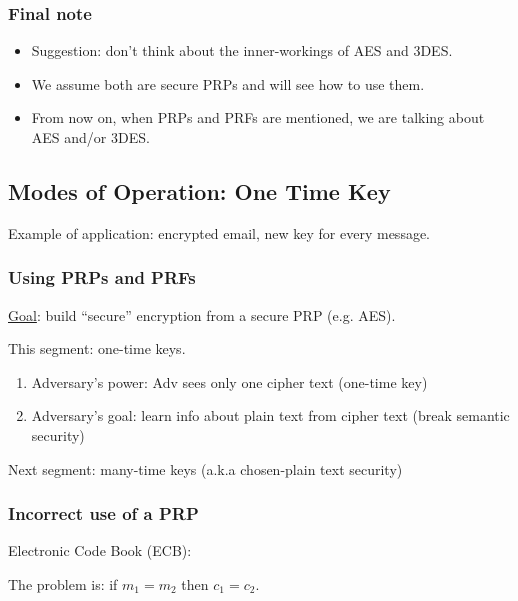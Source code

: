 \documentclass[12pt]{book}
\newcommand{\idiii}[1]{%
\pgfmathsetmacro{\idii}{#1-1}}
\begin{document}
\subsubsection{Final note}
\begin{itemize}
	\item Suggestion: don't think about the inner-workings of AES and 3DES.
	\item We assume both are secure PRPs and will see how to use them.
	\item From now on, when PRPs and PRFs are mentioned, we are talking about AES and/or 3DES.
\end{itemize}

\subsection{Modes of Operation: One Time Key}
Example of application: encrypted email, new key for every message.
\subsubsection{Using PRPs and PRFs}
\underline{Goal}: build ``secure'' encryption from a secure PRP (e.g. AES).

This segment: one-time keys.
\begin{enumerate}
	\item Adversary's power: Adv sees only one cipher text (one-time key)
	\item Adversary's goal: learn info about plain text from cipher text (break semantic security)
\end{enumerate}
Next segment: many-time keys (a.k.a chosen-plain text security)

\subsubsection{Incorrect use of a PRP}
Electronic Code Book (ECB):
\begin{center}
\end{center}
The problem is: if $m_{1}=m_{2}$ then $c_{1}=c_{2}$.
\end{document}

